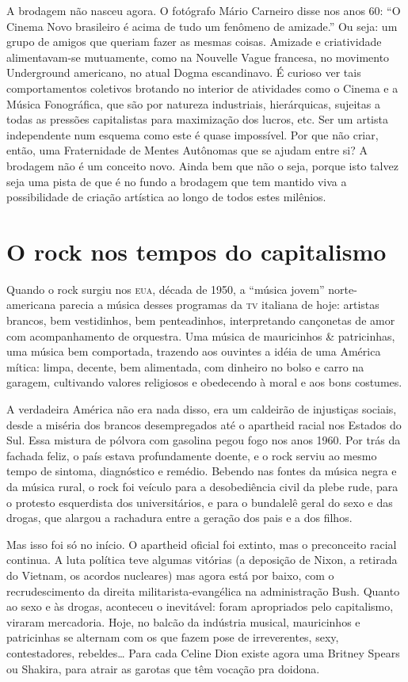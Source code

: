 A brodagem não nasceu agora. O fotógrafo Mário Carneiro disse nos anos
60: “O Cinema Novo brasileiro é acima de tudo um fenômeno de
amizade.” Ou seja: um grupo de amigos que queriam fazer as mesmas
coisas.  Amizade e criatividade alimentavam-se mutuamente, como na
Nouvelle Vague francesa, no movimento Underground americano, no atual
Dogma escandinavo. É curioso ver tais comportamentos coletivos
brotando no interior de atividades como o Cinema e a Música
Fonográfica, que são por natureza industriais, hierárquicas, sujeitas
a todas as pressões capitalistas para maximização dos lucros, etc.
Ser um artista independente num esquema como este é quase impossível.
Por que não criar, então, uma Fraternidade de Mentes Autônomas que se
ajudam entre si?  A brodagem não é um conceito novo. Ainda bem que
não o seja, porque isto talvez seja uma pista de que é no fundo a
brodagem que tem mantido viva a possibilidade de criação artística ao
longo de todos estes milênios.

\chapter{O rock nos tempos do capitalismo}

Quando o rock surgiu nos \textsc{eua}, década de 1950, a “música jovem”
norte-americana parecia a música desses programas da \textsc{tv} italiana de
hoje: artistas brancos, bem vestidinhos, bem penteadinhos,
interpretando cançonetas de amor com acompanhamento de orquestra. Uma
música de mauricinhos \& patricinhas, uma música bem comportada,
trazendo aos ouvintes a idéia de uma América mítica: limpa, decente,
bem alimentada, com dinheiro no bolso e carro na garagem, cultivando
valores religiosos e obedecendo à moral e aos bons costumes.

A verdadeira América não era nada disso, era um caldeirão de
injustiças sociais, desde a miséria dos brancos desempregados até o
apartheid racial nos Estados do Sul. Essa mistura de pólvora com
gasolina pegou fogo nos anos 1960. Por trás da fachada feliz, o país
estava profundamente doente, e o rock serviu ao mesmo tempo de
sintoma, diagnóstico e remédio.  Bebendo nas fontes da música negra e
da música rural, o rock foi veículo para a desobediência civil da
plebe rude, para o protesto esquerdista dos universitários, e para o
bundalelê geral do sexo e das drogas, que alargou a rachadura entre a
geração dos pais e a dos filhos.

Mas isso foi só no início. O apartheid oficial foi extinto, mas o
preconceito racial continua. A luta política teve algumas vitórias (a
deposição de Nixon, a retirada do Vietnam, os acordos nucleares) mas
agora está por baixo, com o recrudescimento da direita
militarista-evangélica na administração Bush. Quanto ao sexo e às
drogas, aconteceu o inevitável: foram apropriados pelo capitalismo,
viraram mercadoria. Hoje, no balcão da indústria musical, mauricinhos
e patricinhas se alternam com os que fazem pose de irreverentes,
sexy, contestadores, rebeldes… Para cada Celine Dion existe agora uma
Britney Spears ou Shakira, para atrair as garotas que têm vocação pra
doidona.

